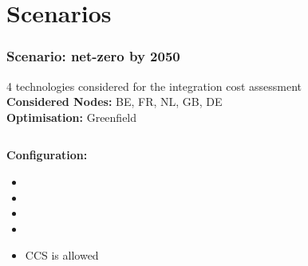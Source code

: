 \documentclass[aspectratio=169]{beamer}
\begin{document}
\section{Scenarios}
\begin{frame}[fragile]
  \frametitle{Scenario: net-zero by 2050}

  4 technologies considered for the integration cost assessment \\
  \textbf{Considered Nodes:} BE, FR, NL, GB, DE \\
  
  \textbf{Optimisation:} Greenfield

  \vspace{1em} %

  \begin{columns}
    \begin{column}{0.5\textwidth}
      \textbf{Configuration:}
      \begin{itemize}
         \item {}
        \item {}
        \item {}
        \item {}
        \item CCS is allowed
      \end{itemize}
    \end{column}

    \begin{column}{0.5\textwidth}
    \end{column}
  \end{columns}
\end{frame}



\end{document}
